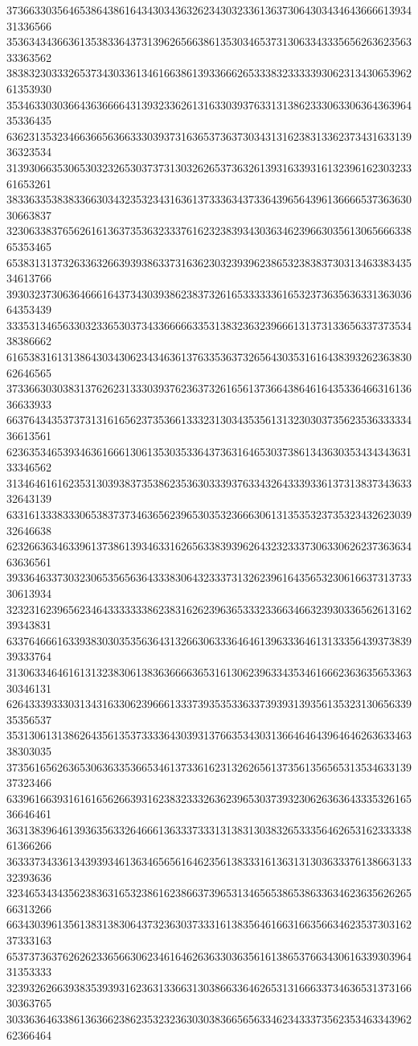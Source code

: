 37366330356465386438616434303436326234303233613637306430343464366661393431336566
35363434366361353833643731396265663861353034653731306334333565626362356333363562
38383230333265373430336134616638613933666265333832333339306231343065396261353930
35346330303664363666643139323362613163303937633131386233306330636436396435336435
63623135323466366563663330393731636537363730343131623831336237343163313936323534
31393066353065303232653037373130326265373632613931633931613239616230323361653261
38336335383833663034323532343163613733363437336439656439613666653736363030663837
32306338376562616136373536323337616232383934303634623966303561306566633865353465
65383131373263363266393938633731636230323939623865323838373031346338343534613766
39303237306364666164373430393862383732616533333361653237363563633136303664353439
33353134656330323365303734336666633531383236323966613137313365633737353438386662
61653831613138643034306234346361376335363732656430353161643839326236383062646565
37336630303831376262313330393762363732616561373664386461643533646631613636633933
66376434353737313161656237353661333231303435356131323030373562353633333436613561
62363534653934636166613061353035336437363164653037386134363035343434363133346562
31346461616235313039383735386235363033393763343264333933613731383734363332643139
63316133383330653837373463656239653035323666306131353532373532343262303932646638
62326636346339613738613934633162656338393962643232333730633062623736363463636561
39336463373032306535656364333830643233373132623961643565323061663731373330613934
32323162396562346433333338623831626239636533323366346632393033656261316239343831
63376466616339383030353563643132663063336464613963336461313335643937383939333764
31306334646161313238306138363666636531613062396334353461666236363565336330346131
62643339333031343163306239666133373935353363373939313935613532313065633935356537
35313061313862643561353733336430393137663534303136646464396464626363346338303035
37356165626365306363353665346137336162313262656137356135656531353463313937323466
63396166393161616562663931623832333263623965303739323062636364333532616536646461
36313839646139363563326466613633373331313831303832653335646265316233333861366266
36333734336134393934613634656561646235613833316136313130363337613866313332393636
32346534343562383631653238616238663739653134656538653863363462363562626566313266
66343039613561383138306437323630373331613835646166316635663462353730316237333163
65373736376262623365663062346164626363303635616138653766343061633930396431353333
32393262663938353939316236313366313038663364626531316663373463653137316630363765
30336364633861363662386235323236303038366565633462343337356235346334396262366464
